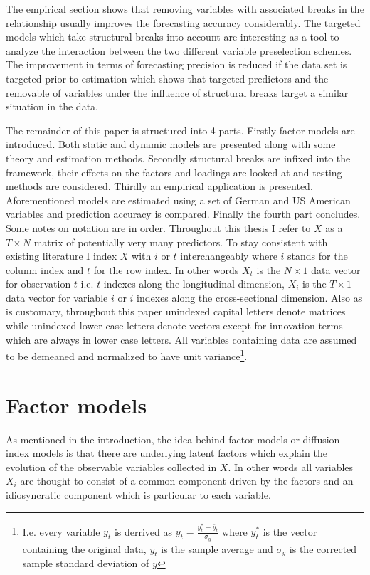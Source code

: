 \documentclass[12pt]{article}
\begin{document}
The empirical section shows that removing variables with associated breaks in the relationship usually improves the forecasting accuracy considerably. The targeted models which take structural breaks into account are interesting as a tool to analyze the interaction between the two different variable preselection schemes. The improvement in terms of forecasting precision is reduced if the data set is targeted prior to estimation which shows that targeted predictors and the removable of variables under the influence of structural breaks target a similar situation in the data.

The remainder of this paper is structured into 4 parts. Firstly factor models are introduced. Both static and dynamic models are presented along with some theory and estimation methods. Secondly structural breaks are infixed into the framework, their effects on the factors and loadings are looked at and testing methods are considered. Thirdly an empirical application is presented. Aforementioned models are estimated using a set of German and US American variables and prediction accuracy is compared. Finally the fourth part concludes. \\

Some notes on notation are in order. Throughout this thesis I refer to $X$ as a $T \times N$ matrix of potentially very many predictors. To stay consistent with existing literature I index $X$ with $i$ or $t$ interchangeably where $i$ stands for the column index and $t$ for the row index. In other words $X_t$ is the $N \times 1$ data vector for observation $t$ i.e. $t$ indexes along the longitudinal dimension, $X_i$ is the $T \times 1$ data vector for variable $i$ or $i$ indexes along the cross-sectional dimension. Also as is customary, throughout this paper unindexed capital letters denote matrices while unindexed lower case letters denote vectors except for innovation terms which are always in lower case letters. All variables containing data are assumed to be demeaned and normalized to have unit variance\footnote{I.e. every variable $y_t$ is derrived as $y_t = \frac{y_t^* - \bar y_t}{\sigma_{y}}$ where $y_t^*$ is the vector containing the original data, $\bar y_t$ is the sample average and $\sigma_{y}$ is the corrected sample standard deviation of $y$}.

\section{Factor models}
As mentioned in the introduction, the idea behind factor models or diffusion index models is that there are underlying latent factors which explain the evolution of the observable variables collected in $X$. In other words all variables $X_i$ are thought to consist of a common component driven by the factors and an idiosyncratic component which is particular to each variable.
\end{document}
